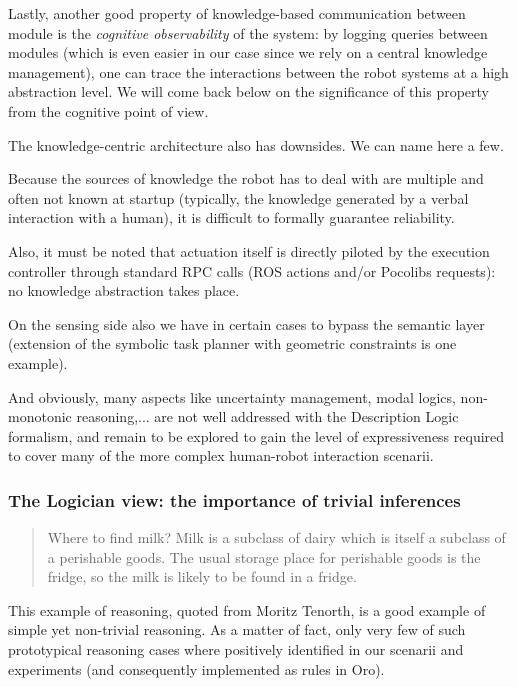 \documentclass[letterpaper, 10 pt, conference]{ieeeconf}  %
\begin{document}
Lastly, another good property of knowledge-based communication between module
is the \emph{cognitive observability} of the system: by logging queries between
modules (which is even easier in our case since we rely on a central knowledge
management), one can trace the interactions between the robot systems at a high
abstraction level. We will come back below on the significance of this property
from the cognitive point of view.

The knowledge-centric architecture also has downsides. We can name here a few.

Because the sources of knowledge the robot has to deal with are multiple and
often not known at startup (typically, the knowledge generated by a verbal
interaction with a human), it is difficult to formally guarantee reliability.

Also, it must be noted that actuation itself is directly piloted by the
execution controller through standard RPC calls (ROS actions and/or Pocolibs
requests): no knowledge abstraction takes place.

On the sensing side also we have in certain cases to bypass the semantic layer
(extension of the symbolic task planner with geometric constraints is one
example).

And obviously, many aspects like uncertainty management, modal logics,
non-monotonic reasoning,... are not well addressed with the Description Logic
formalism, and remain to be explored to gain the level of expressiveness
required to cover many of the more complex human-robot interaction scenarii.

\subsubsection{The Logician view: the importance of trivial inferences}

\begin{quote}

    Where to find milk? Milk is a subclass of dairy which is itself a subclass
    of a perishable goods. The usual storage place for perishable goods is the
    fridge, so the milk is likely to be found in a fridge.

\end{quote}

This example of reasoning, quoted from Moritz Tenorth, is a good example of
simple yet non-trivial reasoning. As a matter of fact, only very few of such
prototypical reasoning cases where positively identified in our scenarii and experiments
(and consequently implemented as rules in {\sc Oro}).
\end{document}

